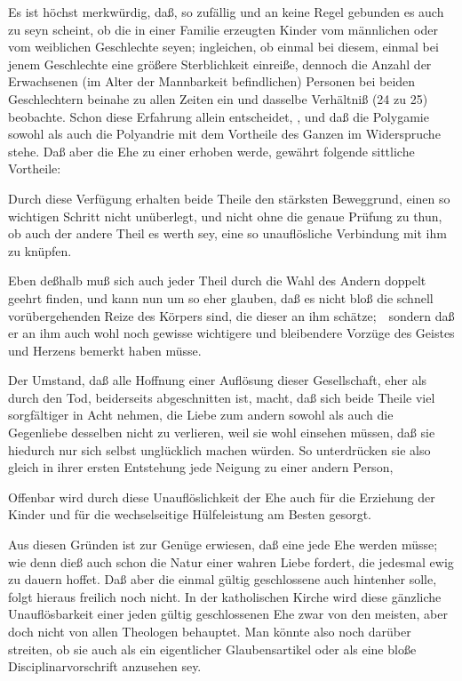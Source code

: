 \begin{aufza}
\item Es ist höchst merkwürdig, daß, so zufällig und an keine Regel gebunden es auch zu seyn scheint, ob die in einer Familie erzeugten Kinder vom männlichen oder vom weiblichen Geschlechte seyen; ingleichen, ob einmal bei diesem, einmal bei jenem Geschlechte eine größere Sterblichkeit einreiße, dennoch die Anzahl der Erwachsenen (im Alter der Mannbarkeit befindlichen) Personen bei beiden Geschlechtern beinahe zu allen Zeiten ein und dasselbe Verhältniß (24 zu 25) beobachte. Schon diese Erfahrung allein entscheidet, , und daß die Polygamie sowohl als auch die Polyandrie mit dem Vortheile des Ganzen im Widerspruche stehe. Daß aber die Ehe zu einer  erhoben werde, gewährt folgende sittliche Vortheile:
\begin{aufzb}
\item Durch diese Verfügung erhalten beide Theile den stärksten Beweggrund, einen so wichtigen Schritt nicht unüberlegt, und nicht ohne die genaue Prüfung zu thun, ob auch der andere Theil es werth sey, eine so unauflösliche Verbindung mit ihm zu knüpfen.
\item Eben deßhalb muß sich auch jeder Theil durch die Wahl des Andern doppelt geehrt finden, und kann nun um so eher glauben, daß es nicht bloß die schnell vorübergehenden Reize des Körpers sind, die dieser an ihm schätze;~\ sondern daß er an ihm auch wohl noch gewisse wichtigere und bleibendere Vorzüge des Geistes und Herzens bemerkt haben müsse.
\item Der Umstand, daß alle Hoffnung einer Auflösung dieser Gesellschaft, eher als durch den Tod, beiderseits abgeschnitten ist, macht, daß sich beide Theile viel sorgfältiger in Acht nehmen, die Liebe zum andern sowohl als auch die Gegenliebe desselben nicht zu verlieren, weil sie wohl einsehen müssen, daß sie hiedurch nur sich selbst unglücklich machen würden. So unterdrücken sie also gleich in ihrer ersten Entstehung jede Neigung zu einer andern Person, \usw\
\item Offenbar wird durch diese Unauflöslichkeit der Ehe auch für die Erziehung der Kinder und für die wechselseitige Hülfeleistung am Besten gesorgt.
\end{aufzb}
\begin{RWanm} 
Aus diesen Gründen ist zur Genüge erwiesen, daß eine jede Ehe  werden müsse; wie denn dieß auch schon die Natur einer wahren Liebe fordert, die jedesmal ewig zu dauern hoffet. Daß aber die einmal gültig geschlossene auch hintenher  solle, folgt hieraus freilich noch nicht. In der katholischen Kirche wird diese gänzliche Unauflösbarkeit einer jeden gültig geschlossenen Ehe zwar von den meisten, aber doch nicht von allen Theologen behauptet. Man könnte also noch darüber streiten, ob sie auch als ein eigentlicher Glaubensartikel oder als eine bloße Disciplinarvorschrift anzusehen sey. 

\end{RWanm}
\end{aufza}
